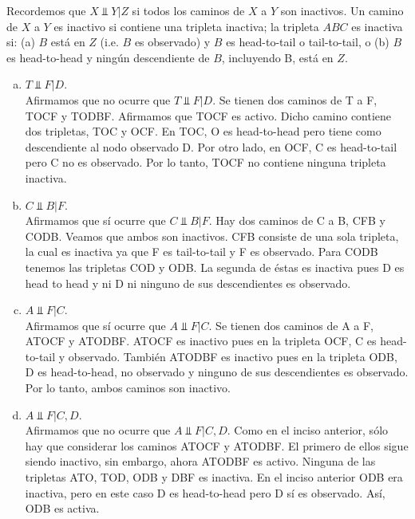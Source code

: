 \documentclass[letterpaper,11pt]{article}
\begin{document}
Recordemos que $X\Perp Y|Z$ si todos los caminos de $X$ a $Y$ son inactivos. Un camino de $X$ a $Y$ es
        inactivo si contiene una tripleta inactiva; la tripleta $ABC$ es inactiva si: (a) $B$ está en $Z$ (i.e. $B$ es
        observado) y $B$ es head-to-tail o tail-to-tail, o (b) $B$ es head-to-head y ningún descendiente de $B$,
        incluyendo B,  está en $Z$.
\begin{enumerate}[a.]
    \item $T\Perp F|D$. \\
        Afirmamos que no ocurre que $T\Perp F|D$. Se tienen dos caminos de T a F, TOCF y TODBF. Afirmamos que TOCF es activo.
        Dicho camino contiene dos tripletas,
        TOC y OCF. En TOC, O es head-to-head pero tiene como descendiente al nodo observado D. Por otro lado, en OCF, C
        es head-to-tail pero C no es observado. Por lo tanto, TOCF no contiene ninguna tripleta inactiva. 
    \item $C\Perp B|F$.\\
        Afirmamos que sí ocurre que $C\Perp B|F$. Hay dos caminos de C a B, CFB y  CODB. Veamos que ambos son inactivos. CFB consiste de una sola tripleta, la
        cual es inactiva ya que F es tail-to-tail y F es observado. Para CODB tenemos las tripletas COD y ODB. La
        segunda de éstas es inactiva pues D es head to head y ni D ni ninguno de sus descendientes es observado. 
    \item $A\Perp F|C$.\\
        Afirmamos que sí ocurre que $A\Perp F|C$. Se tienen dos caminos de A a F, ATOCF y ATODBF. ATOCF es inactivo pues en la tripleta  OCF, C es head-to-tail y
        observado. También ATODBF es inactivo pues en la tripleta ODB, D es head-to-head, no observado y ninguno de sus
        descendientes es observado. Por lo tanto, ambos caminos son inactivo. 
    \item $A\Perp F|C,D$. \\
        Afirmamos que no ocurre que $A\Perp F|C,D$. Como  en el inciso anterior, sólo hay que considerar los  caminos ATOCF y
        ATODBF. El primero de ellos sigue siendo inactivo, sin embargo, ahora ATODBF es activo. Ninguna de las tripletas
        ATO, TOD, ODB y DBF es inactiva. En el inciso anterior ODB era inactiva, pero en este caso D es head-to-head
        pero D sí es observado. Así, ODB es activa.
\end{enumerate}
\end{document}
